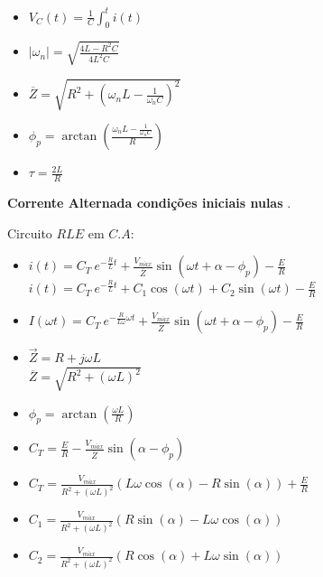 \begin{enumerate}
\begin{itemize}
%
\item
$V_C(t)=\frac{1}{C}\int_0^ti(t)$\par
%
\begin{minipage}{0.95\linewidth}
\end{minipage}\par
%
\end{itemize}
\end{enumerate}
%
\begin{itemize}
\item
$| \omega_n |=\sqrt{\frac{4 L-R^2 C}{4 L^2 C}}$\par
\item
$\overline{Z}=\sqrt{R^2 + (\omega_n L -\frac{1}{\omega_n C})^2}$\par
\item
$\phi_p=\arctan\left(\frac{\omega_n L - \frac{1}{\omega_n C}}{R}\right)$\par
\item
$\tau=\frac{2 L}{R}$\par
\end{itemize}
\begin{flushleft}
{\bf Corrente  Alternada condi\c{c}\~{o}es  iniciais  nulas }.
\end{flushleft}
\quad Circuito  $RLE$ em $C.A$:\par
\begin{itemize}
\item
$i(t)=C_T\ e^{-\frac{R}{L}t}+\frac{V_{m\acute{a}x}}{\overline{Z}}\sin(\omega t + \alpha - \phi_p)-\frac{E}{R}$\newline
$i(t)=C_T\ e^{-\frac{R}{L}t} + C_1 \cos (\omega t) + C_2 \sin(\omega t)-\frac{E}{R}$
\item
$I(\omega t)=C_T\ e^{-\frac{R}{L \omega}\omega t}+\frac{V_{m\acute{a}x}}{\overline{Z}}\sin(\omega t + \alpha - \phi_p)-\frac{E}{R}$
\item
$\overrightarrow{Z}=R+j\omega L$\\
$\overline{Z}=\sqrt{R^2 + (\omega L)^2}$
\item
$\phi_p=\arctan(\frac{\omega L}{R})$
\item
$C_T=\frac{E}{R}-\frac{V_{m\acute{a}x}}{\overline{Z}}\sin(\alpha - \phi_p)$
\item
$C_T=\frac{V_{m\acute{a}x}}{R^2 + (\omega L)^2}(L \omega \cos(\alpha) - R \sin (\alpha))+\frac{E}{R}$
\item
$C_1=\frac{V_{m\acute{a}x}}{R^2 + (\omega L)^2}(R \sin (\alpha) - L \omega \cos(\alpha))$
\item
$C_2=\frac{V_{m\acute{a}x}}{R^2 + (\omega L)^2}(R \cos (\alpha) + L \omega \sin (\alpha))$
%
\end{itemize}
